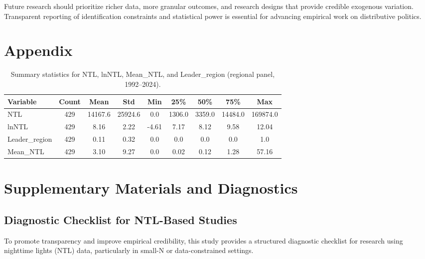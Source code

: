 \documentclass[12pt,a4paper]{article}
\begin{document}
Future research should prioritize richer data, more granular outcomes, and research designs that provide credible exogenous variation. Transparent reporting of identification constraints and statistical power is essential for advancing empirical work on distributive politics.






\section{Appendix}


\begin{table}[ht]
\centering
\caption{Summary statistics for NTL, lnNTL, Mean\_NTL, and Leader\_region (regional panel, 1992--2024).}
\begin{tabular}{lcccccccc}
\toprule
Variable & Count & Mean & Std & Min & 25\% & 50\% & 75\% & Max \\
\midrule
NTL & 429 & 14167.6 & 25924.6 & 0.0 & 1306.0 & 3359.0 & 14484.0 & 169874.0 \\
lnNTL & 429 & 8.16 & 2.22 & -4.61 & 7.17 & 8.12 & 9.58 & 12.04 \\
Leader\_region & 429 & 0.11 & 0.32 & 0.0 & 0.0 & 0.0 & 0.0 & 1.0 \\
Mean\_NTL & 429 & 3.10 & 9.27 & 0.0 & 0.02 & 0.12 & 1.28 & 57.16 \\
\bottomrule
\end{tabular}
\label{tab:summary_stats}
\end{table}
\appendix
\section{Supplementary Materials and Diagnostics}

\subsection{Diagnostic Checklist for NTL-Based Studies}

To promote transparency and improve empirical credibility, this study provides a structured diagnostic checklist for research using nighttime lights (NTL) data, particularly in small-N or data-constrained settings.
\end{document}
